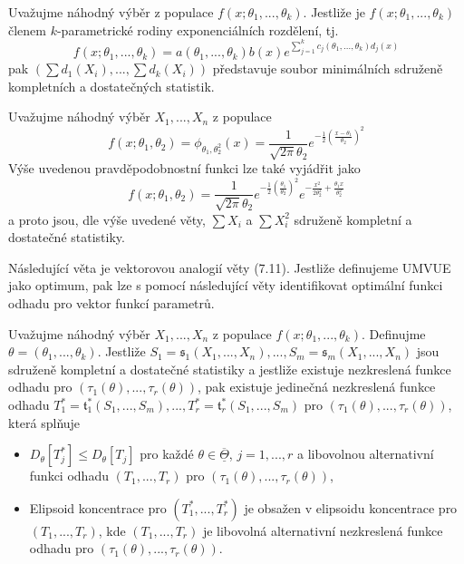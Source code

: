 \begin{theorem}
Uvažujme náhodný výběr z populace $f(x; \theta_1, ..., \theta_k)$. Jestliže je  $f(x; \theta_1, ..., \theta_k)$ členem $k$-parametrické rodiny exponenciálních rozdělení, tj.
\begin{equation*}
f(x; \theta_1, ..., \theta_k) = a(\theta_1, ..., \theta_k)b(x)e^{\sum_{j = 1}^k c_j(\theta_1, ..., \theta_k)d_j(x)}
\end{equation*}
pak $\left(\sum d_1(X_i), ..., \sum d_k(X_i)\right)$ představuje soubor minimálních sdruženě kompletních a dostatečných statistik.
\end{theorem}

\begin{example}
Uvažujme náhodný výběr $X_1, ..., X_n$ z populace
\begin{equation*}
f(x; \theta_1, \theta_2) = \phi_{\theta_1, \theta_2^2}(x) = \frac{1}{\sqrt{2 \pi}\theta_2}e^{-\frac{1}{2}\left(\frac{x - \theta_1}{\theta_2}\right)^2}
\end{equation*}
Výše uvedenou pravděpodobnostní funkci lze také vyjádřit jako
\begin{equation*}
f(x; \theta_1, \theta_2) = \frac{1}{\sqrt{2 \pi} \theta_2}e^{-\frac{1}{2}\left(\frac{\theta_1}{\theta_2}\right)^2}e^{-\frac{x^2}{2 \theta_2^2} + \frac{\theta_1 x}{\theta_2^2}}
\end{equation*}
a proto jsou, dle výše uvedené věty, $\sum X_i$ a $\sum X_i^2$ sdruženě kompletní a dostatečné statistiky.
\end{example}

Následující věta je vektorovou analogií věty (7.11). Jestliže definujeme UMVUE jako optimum, pak lze s pomocí následující věty identifikovat optimální funkci odhadu pro vektor funkcí parametrů.

\begin{theorem}
Uvažujme náhodný výběr $X_1, ..., X_n$ z populace $f(x; \theta_1, ..., \theta_k)$. Definujme $\theta = (\theta_1, ..., \theta_k)$. Jestliže $S_1 = \mathfrak{s}_1(X_1, ..., X_n), ..., S_m = \mathfrak{s}_m(X_1, ..., X_n)$ jsou sdruženě kompletní a dostatečné statistiky a jestliže existuje nezkreslená funkce odhadu pro $(\tau_1(\theta), ..., \tau_r(\theta))$, pak existuje jedinečná nezkreslená funkce odhadu $T_1^* = \mathfrak{t}_1^*(S_1, ..., S_m), ..., T_r^* = \mathfrak{t}_r^*(S_1, ..., S_m)$ pro $(\tau_1(\theta), ..., \tau_r(\theta))$, která splňuje
\begin{itemize}
\item $D_{\theta}[T_j^*] \le D_{\theta}[T_j]$ pro každé $\theta \in \overline{\underline{\Theta}}$, $j = 1, ..., r$ a libovolnou alternativní funkci odhadu $(T_1, ..., T_r)$ pro $(\tau_1(\theta), ..., \tau_r(\theta))$,
\item Elipsoid koncentrace pro $(T_1^*, ..., T_r^*)$ je obsažen v elipsoidu koncentrace pro $(T_1, ..., T_r)$, kde $(T_1, ..., T_r)$ je libovolná alternativní nezkreslená funkce odhadu pro $(\tau_1(\theta), ..., \tau_r(\theta))$.
\end{itemize}
\end{theorem}

